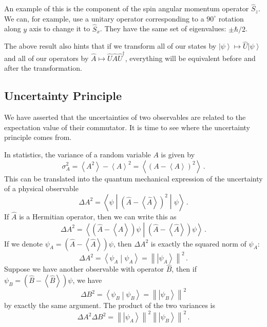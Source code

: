 \documentclass{article}
\theoremstyle{plain}\theoremheaderfont{\normalfont\itshape}\theorembodyfont{\rmfamily}\theoremseparator{.}\newtheorem*{rem}{Remark}\newtheorem*{ex}{Example}\newtheorem*{proof}{Proof}\newtheorem*{altp}{Alternative proof}
\theoremstyle{plain}\theoremheaderfont{\normalfont\bfseries}\theorembodyfont{\rmfamily}\theoremseparator{.}\newtheorem{thm}{Theorem}[section]\newtheorem{lem}[thm]{Lemma}\newtheorem{prop}[thm]{Proposition}\newtheorem*{cor}{Corollary}\newtheorem{defn}[thm]{Definition}\newtheorem{clm}[thm]{Claim}\newtheorem{clminproof}{Claim}
\theoremstyle{break}\theoremheaderfont{\normalfont\itshape}\theorembodyfont{\rmfamily}\theoremseparator{.\medskip}\newtheorem*{proofskip}{Proof}\newtheorem*{exs}{Examples}\newtheorem*{rems}{Remarks}
\theoremstyle{break}\theoremheaderfont{\normalfont\bfseries}\theorembodyfont{\rmfamily}\theoremseparator{.\medskip}\newtheorem{lemskip}[thm]{Lemma}\newtheorem{defnskip}[thm]{Definition}\newtheorem{propskip}[thm]{Proposition}\newtheorem{thmskip}[thm]{Theorem}
\numberwithin{equation}{section}
\newcommand{\ket}[1]{\left| #1 \right\rangle}
\newcommand{\braket}[2]{\left\langle #1 \middle| #2 \right\rangle}
\newcommand{\eval}[1]{\left\langle #1 \right\rangle}
\newcommand{\expval}[2]{\left\langle #2 \middle| #1 \middle| #2 \right\rangle}
\newcommand{\norm}[1]{\left\| #1 \right\|}
\begin{document}
    An example of this is the component of the spin angular momentum operator \(\hat{S}_z\). We can, for example, use a unitary operator corresponding to a \(90^\circ\) rotation along \(y\) axis to change it to \(\hat{S}_x\). They have the same set of eigenvalues: \(\pm\hbar/2\).

    The above result also hints that if we transform all of our states by \(\ket{\psi}\mapsto\hat{U}\ket{\psi}\) and all of our operators by \(\hat{A}\mapsto\hat{U}\hat{A}\hat{U}^\dagger\), everything will be equivalent before and after the transformation.

    \subsection{Uncertainty Principle}
    We have asserted that the uncertainties of two observables are related to the expectation value of their commutator. It is time to see where the uncertainty principle comes from.

    In statistics, the variance of a random variable \(A\) is given by
    \begin{equation}
        \sigma_A^2=\eval{A^2}-\eval{A}^2=\eval{(A-\eval{A})^2}\,.
    \end{equation}
    This can be translated into the quantum mechanical expression of the uncertainty of a physical observable
    \begin{equation}
        \Delta A^2=\expval{\left(\hat{A}-\eval{\hat{A}}\right)^2}{\psi}\,.
    \end{equation}
    If \(\hat{A}\) is a Hermitian operator, then we can write this as
    \begin{equation}
        \Delta A^2=\braket{\left(\hat{A}-\eval{\hat{A}}\right)\psi}{\left(\hat{A}-\eval{\hat{A}}\right)\psi}\,.
    \end{equation}
    If we denote \(\psi_A=\left(\hat{A}-\eval{\hat{A}}\right)\psi\), then \(\Delta A^2\) is exactly the squared norm of \(\psi_A\):
    \begin{equation}
        \Delta A^2=\braket{\psi_A}{\psi_A}=\norm{\ket{\psi_A}}^2\,.
    \end{equation}
    Suppose we have another observable with operator \(\hat{B}\), then if \(\psi_B=\left(\hat{B}-\eval{\hat{B}}\right)\psi\), we have
    \begin{equation}
        \Delta B^2=\braket{\psi_B}{\psi_B}=\norm{\ket{\psi_B}}^2
    \end{equation}
    by exactly the same argument. The product of the two variances is
    \begin{equation}
        \Delta A^2\Delta B^2=\norm{\ket{\psi_A}}^2\norm{\ket{\psi_B}}^2\,.
    \end{equation}
\end{document}
